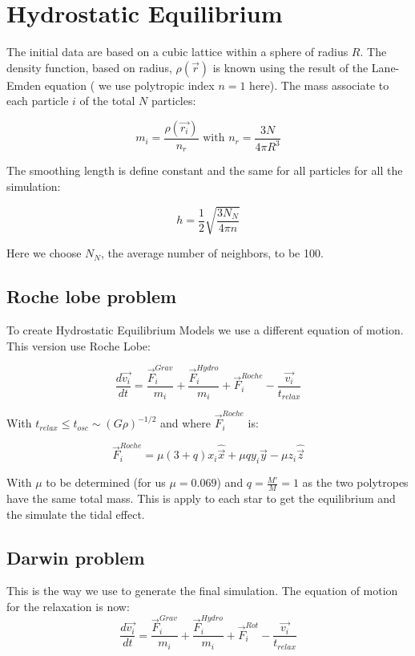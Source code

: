 \documentclass[notes.tex]{subfiles}
\begin{document}
\section{Hydrostatic Equilibrium}
\label{sec:equi}

The initial data are based on a cubic lattice within a sphere of radius $R$.
The density function, based on radius, $\rho(\vec{r})$ is known using the result of the Lane-Emden equation ( we use polytropic index $n = 1$ here).
The mass associate to each particle $i$ of the total $N$ particles:

$$ m_i = \frac{\rho(\vec{r_i})}{n_r} \mbox{ with } n_r = \frac{3N}{4 \pi R^3}$$

The smoothing length is define constant and the same for all particles for all the simulation:

$$ h = \frac{1}{2}\sqrt{\frac{3N_N}{4\pi n}} $$

Here we choose $N_N$, the average number of neighbors, to be 100.

\subsection{Roche lobe problem}

To create Hydrostatic Equilibrium Models we use a different equation of motion. This version use Roche Lobe:

\begin{equation}
\frac{d\vec{v_i}}{dt} = \frac{\vec{F}_i^{Grav}}{m_i} + \frac{\vec{F}_i^{Hydro}}{m_i} + \vec{F}_i^{Roche} - \frac{\vec{v_i}}{t_{relax}}
\end{equation}


With $t_{relax} \leq t_{osc} \sim (G\rho)^{-1/2}$ and
where $\vec{F}_i^{Roche}$ is:

$$\vec{F}_i^{Roche} = \mu (3+q) x_i \hat{\vec{x}} + \mu q y_i \hat{\vec{y}}-\mu z_i \hat{\vec{z}}$$

With $\mu$ to be determined (for us $\mu = 0.069$) and $q = \frac{M'}{M}=1$ as the two polytropes have the same total mass.
This is apply to each star to get the equilibrium and the simulate the tidal effect.

\subsection{Darwin problem}

This is the way we use to generate the final simulation.
The equation of motion for the relaxation is now:
\begin{equation}
\label{eq:darwin}
\frac{d\vec{v_i}}{dt} = \frac{\vec{F}_i^{Grav}}{m_i} +\frac{\vec{F}_i^{Hydro}}{m_i} + \vec{F}_i^{Rot} - \frac{\vec{v_i}}{t_{relax}}
\end{equation}
\end{document}
